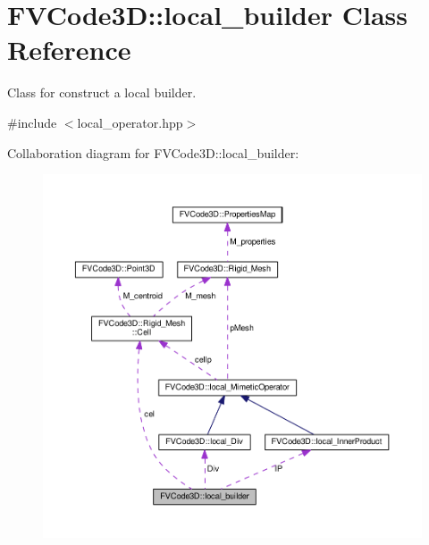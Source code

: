 \hypertarget{classFVCode3D_1_1local__builder}{}\section{F\+V\+Code3D\+:\+:local\+\_\+builder Class Reference}
\label{classFVCode3D_1_1local__builder}


Class for construct a local builder.  




{\ttfamily \#include $<$local\+\_\+operator.\+hpp$>$}



Collaboration diagram for F\+V\+Code3D\+:\+:local\+\_\+builder\+:
\nopagebreak
\begin{figure}[H]
\begin{center}
\leavevmode
\includegraphics[width=350pt]{classFVCode3D_1_1local__builder__coll__graph}
\end{center}
\end{figure}
